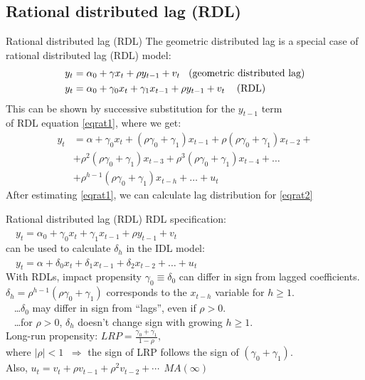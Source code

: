 \documentclass{beamer}
\begin{document}
\subsection{Rational distributed lag (RDL)}
\begin{frame}{Rational distributed lag (RDL)}
The geometric distributed lag is a special case of \\rational distributed lag (RDL) model:
\begin{align} \nonumber
y_t & = \alpha_0+\gamma x_t + \rho y_{t-1} + v_t \hspace{0.3cm} \textnormal{(geometric distributed lag)}\\\label{eqrat1} 
y_t & = \alpha_0+\gamma_0 x_t +\gamma_1 x_{t-1} + \rho y_{t-1} + v_t  \hspace{0.3cm} \textnormal{ (RDL)}
\end{align}
This can be shown by successive substitution for the $y_{t-1}$ term \\of RDL equation \eqref{eqrat1}, where we get:
\begin{align}\nonumber
y_t & = \alpha + \gamma_0 x_t + (\rho \gamma_0 + \gamma_1) x_{t-1} + \rho (\rho \gamma_0 + \gamma_1) x_{t-2} +\\ & + \rho^2 (\rho \gamma_0 + \gamma_1) x_{t-3} + \rho^3 (\rho \gamma_0 + \gamma_1) x_{t-4}+ \dots \nonumber \\  &+\rho^{h-1}(\rho \gamma_0 + \gamma_1)x_{t-h} + \dots + u_t \label{eqrat2}
\end{align}
After estimating \eqref{eqrat1}, we can calculate lag distribution for \eqref{eqrat2}
\end{frame}
\begin{frame}{Rational distributed lag (RDL)}
RDL specification:\\
\medskip
$\quad y_t = \alpha_0+\gamma_0 x_t +\gamma_1 x_{t-1} + \rho y_{t-1}  + v_t $\\
\medskip
can be used to calculate $\delta_h$ in the IDL model:\\
\medskip
$\quad y_t = \alpha + \delta_0 x_t  + \delta_1 x_{t-1} + \delta_2 x_{t-2} + \dots + u_t $\\
\medskip
With RDLs, impact propensity $\gamma_0 \equiv \delta_0$ can differ in sign from lagged coefficients. \\
\medskip
$\delta_h = \rho^{h-1}(\rho \gamma_0 + \gamma_1)$ corresponds to the $x_{t-h}$ variable for $h \geq 1$. \\
\smallskip
~ \dots $\delta_0$ may differ in sign from ``lags'', even if $\rho > 0$.\\
~ \dots for $\rho > 0$, $\delta_h$ doesn't change sign with growing $h \geq 1$. \\
\bigskip
Long-run propensity: $\textit{LRP} = \frac{\gamma_0 + \gamma_1}{1-\rho},$\\
\smallskip
where $|\rho| < 1$ $\> \Rightarrow$ the sign of LRP follows the sign of $(\gamma_0+\gamma_1)$. \\
\medskip
Also,  $u_t = v_t + \rho v_{t-1} + \rho^2 v_{t-2} + \cdots \> \>  MA(\infty)$
\end{frame}
\end{document}
